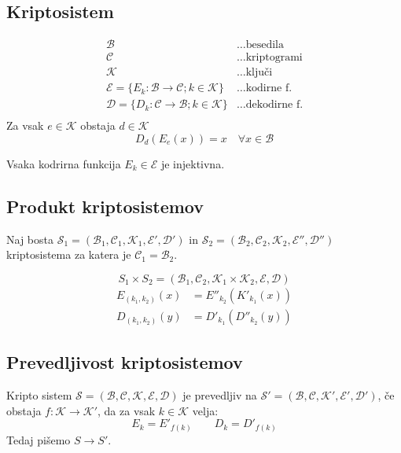 
 

\begin{multicols}{4}
\setlength{\premulticols}{1pt}
\setlength{\postmulticols}{1pt}
\setlength{\multicolsep}{1pt}
\setlength{\columnsep}{2pt}

\section*{Kriptosistem}
\begin{align*}
	\mathcal{B} &\dots \text{besedila} \\
	\mathcal{C} &\dots \text{kriptogrami} \\
	\mathcal{K} &\dots \text{ključi} \\
	\mathcal{E} = \{E_k : \mathcal{B} \to \mathcal{C}; k \in \mathcal{K} \} &\dots \text{kodirne f.} \\
	\mathcal{D} = \{D_k : \mathcal{C} \to \mathcal{B}; k \in \mathcal{K} \} &\dots \text{dekodirne f.} \\
\end{align*}
Za vsak $e \in \mathcal{K}$ obstaja $d \in \mathcal{K}$
\[ D_d(E_e(x)) = x \quad \forall x \in \mathcal{B}\]

Vsaka kodrirna funkcija $E_k \in \mathcal{E}$ je injektivna.

\subsection*{Produkt kriptosistemov}
Naj bosta $\mathcal{S}_1 = (\mathcal{B}_1, \mathcal{C}_1, \mathcal{K}_1, \mathcal{E}', \mathcal{D}')$ in 
$\mathcal{S}_2 = (\mathcal{B}_2, \mathcal{C}_2, \mathcal{K}_2, \mathcal{E}'', \mathcal{D}'')$ kriptosistema za katera
je $\mathcal{C}_1 = \mathcal{B}_2$.

\[ S_1 \times S_2 = (\mathcal{B}_1, \mathcal{C}_2, \mathcal{K}_1 \times \mathcal{K}_2, \mathcal{E}, \mathcal{D})\]
\begin{align*}
	E_{(k_1, k_2)} (x) &= E''_{k_2}(K'_{k_1}(x)) \\
	D_{(k_1, k_2)} (y) &= D'_{k_1}(D''_{k_2}(y))
\end{align*}

\subsection*{Prevedljivost kriptosistemov}
Kripto sistem $\mathcal{S} = (\mathcal{B}, \mathcal{C}, \mathcal{K}, \mathcal{E}, \mathcal{D})$ je prevedljiv na
$\mathcal{S}' = (\mathcal{B}, \mathcal{C}, \mathcal{K}', \mathcal{E}', \mathcal{D}')$, če obstaja $f: \mathcal{K} \to \mathcal{K}'$, 
da za vsak $k \in \mathcal{K}$ velja:
\[ E_k = E'_{f(k)} \qquad D_k = D'_{f(k)} \]
Tedaj pišemo $S \to S'$.


\end{multicols}
